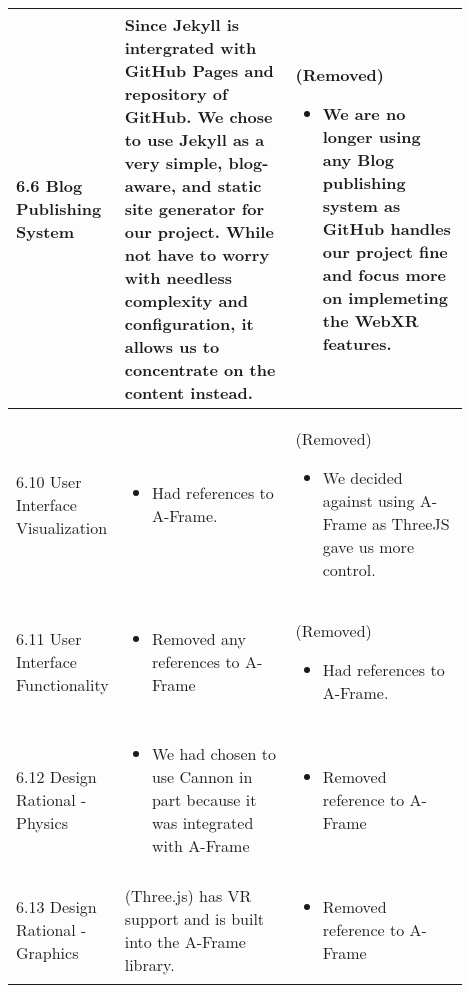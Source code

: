 \documentclass[onecolumn, draftclsnofoot,10pt, compsoc]{IEEEtran}
\begin{document}
\begin{longtable}{ |p{0.1\linewidth}|p{0.4\linewidth}|p{0.4\linewidth}| }
  6.6 Blog Publishing System
 &
Since Jekyll is intergrated with GitHub Pages and repository of GitHub. We chose to use Jekyll as a very simple, blog-aware, and static site generator for our project. While not have to worry with needless complexity and configuration, it allows us to concentrate on the content instead. 
 & (Removed)
 \begin{itemize}
    \item We are no longer using any Blog publishing system as GitHub handles our project fine and focus more on implemeting the WebXR features. 
 \end{itemize} \\
 \hline
 
   6.10 User Interface Visualization
 &
 \begin{itemize}
    \item Had references to A-Frame.
 \end{itemize}
 & (Removed)
 \begin{itemize}
    \item We decided against using A-Frame as ThreeJS gave us more control.
 \end{itemize} \\
 \hline
 
   6.11 User Interface Functionality
 &
 \begin{itemize}
    \item Removed any references to A-Frame
 \end{itemize}
 & (Removed)
 \begin{itemize}
    \item Had references to A-Frame.
 \end{itemize} \\
 \hline
 
 6.12 Design Rational - Physics
 &
 \begin{itemize}
     \item We had chosen to use Cannon in part because it was integrated with A-Frame
 \end{itemize}
 &
 \begin{itemize}
     \item Removed reference to A-Frame
 \end{itemize} \\
 \hline
 
 6.13 Design Rational - Graphics
 &
 (Three.js) has VR support and is built into the A-Frame library.
 &
 \begin{itemize}
     \item Removed reference to A-Frame
 \end{itemize} \\
 \hline
 

\end{longtable}
\end{document}
